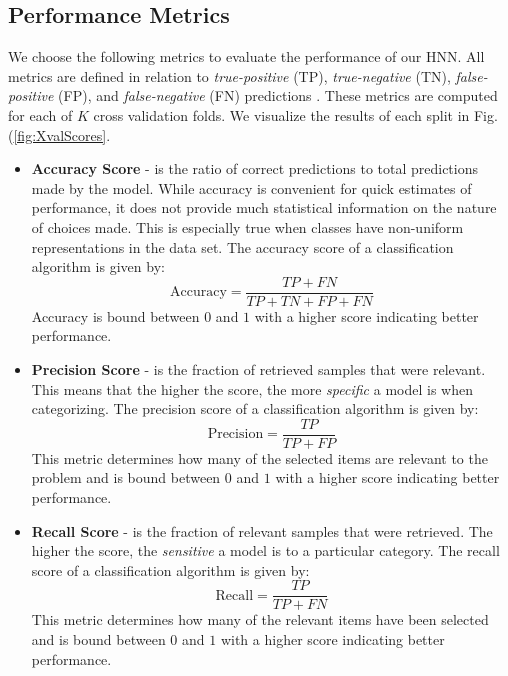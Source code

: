 \documentclass[conference,onecolumn,letterpaper]{IEEEtran}
\begin{document}

\subsection{Performance Metrics}
\label{subsec:Metrics}

We choose the following metrics to evaluate the performance of our HNN. All metrics are defined in relation to \textit{true-positive} (TP), \textit{true-negative} (TN), \textit{false-positive} (FP), and \textit{false-negative} (FN) predictions \cite{Geron,James}. These metrics are computed for each of $K$ cross validation folds. We visualize the results of each split in Fig.(\ref{fig:XvalScores}.

\begin{itemize}
    \item \textbf{Accuracy Score} - is the ratio of correct predictions to total predictions made by the model. While accuracy is convenient for quick estimates of performance, it does not provide much statistical information on the nature of choices made. This is especially true when classes have non-uniform representations in the data set. The accuracy score of a classification algorithm is given by:
    \begin{equation}
        \text{Accuracy} = \frac{TP + FN}{TP + TN + FP + FN}
    \end{equation}
    Accuracy is bound between $0$ and $1$ with a higher score indicating better performance.
    
    \item \textbf{Precision Score} - is the fraction of retrieved samples that were relevant. This means that the higher the score, the more \textit{specific} a model is when categorizing. The precision score of a classification algorithm is given by:
    \begin{equation}
        \text{Precision} = \frac{TP}{TP + FP}
    \end{equation}
    This metric determines how many of the selected items are relevant to the problem and is bound between $0$ and $1$ with a higher score indicating better performance.
    
    \item \textbf{Recall Score} - is the fraction of relevant samples that were retrieved. The higher the score, the \textit{sensitive} a model is to a particular category. The recall score of a classification algorithm is given by:
    \begin{equation}
        \text{Recall} = \frac{TP}{TP + FN}
    \end{equation}
    This metric determines how many of the relevant items have been selected and is bound between $0$ and $1$ with a higher score indicating better performance.
    

\end{itemize}
\end{document}

